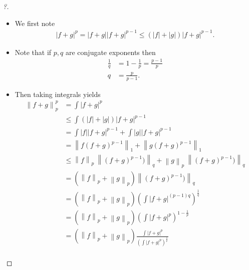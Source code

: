 \begin{proof}[?]
\begin{itemize}
\item
  We first note
  \begin{align*}  
  {\left\lvert {f+g} \right\rvert}^p = {\left\lvert {f+g} \right\rvert}{\left\lvert {f+g} \right\rvert}^{p-1} \leq \left( {\left\lvert {f} \right\rvert} + {\left\lvert {g} \right\rvert}\right) {\left\lvert {f+g} \right\rvert}^{p-1}
  .\end{align*}
\item
  Note that if \(p,q\) are conjugate exponents then
  \begin{align*}  
  \frac 1 q &= 1 - \frac 1 p = \frac{p-1} p \\
  q &= \frac p {p-1} 
  .\end{align*}
\item
  Then taking integrals yields
  \begin{align*}  
  {\left\lVert {f+g} \right\rVert}_p^p &=
  \int {\left\lvert {f+g} \right\rvert}^p \\
  &\leq \int \left( {\left\lvert {f} \right\rvert} + {\left\lvert {g} \right\rvert}\right) {\left\lvert {f+g} \right\rvert}^{p-1} \\ 
  &= \int {\left\lvert {f} \right\rvert} {\left\lvert {f+g} \right\rvert}^{p-1} + \int {\left\lvert {g} \right\rvert} {\left\lvert {f+g} \right\rvert}^{p-1} \\
  &= {\left\lVert {f(f+g)^{p-1}} \right\rVert}_1 + {\left\lVert {g(f+g)^{p-1}} \right\rVert}_1 \\
  &\leq {\left\lVert {f} \right\rVert}_p ~{\left\lVert {(f+g)^{p-1})} \right\rVert}_q + {\left\lVert {g} \right\rVert}_p ~{\left\lVert {(f+g)^{p-1})} \right\rVert}_q \\
  &= \left( {\left\lVert {f} \right\rVert}_p + {\left\lVert {g} \right\rVert}_p \right) {\left\lVert { (f+g)^{p-1})} \right\rVert}_q \\
  &= \left( {\left\lVert {f} \right\rVert}_p + {\left\lVert {g} \right\rVert}_p \right) \left( \int {\left\lvert {f+g} \right\rvert}^{(p-1)q} \right)^{\frac 1 q} \\
  &= \left( {\left\lVert {f} \right\rVert}_p + {\left\lVert {g} \right\rVert}_p \right) \left( \int {\left\lvert {f+g} \right\rvert}^{p} \right)^{1 - \frac 1 p} \\
  &= \left( {\left\lVert {f} \right\rVert}_p + {\left\lVert {g} \right\rVert}_p \right) \frac{\int {\left\lvert {f+g} \right\rvert}^{p} }{\left( \int {\left\lvert {f+g} \right\rvert}^{p} \right)^{\frac 1 p}} \\

\end{align*}
\end{itemize}
\end{proof}
